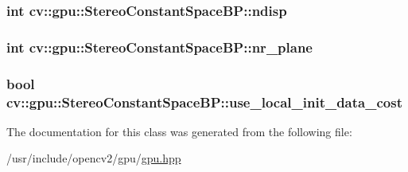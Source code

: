 \hypertarget{classcv_1_1gpu_1_1StereoConstantSpaceBP_ad581f8f942bce3c65131ef5db9051dd3}{
\subsubsection[{ndisp}]{\setlength{\rightskip}{0pt plus 5cm}int cv\-::gpu\-::\-Stereo\-Constant\-Space\-B\-P\-::ndisp}}\label{classcv_1_1gpu_1_1StereoConstantSpaceBP_ad581f8f942bce3c65131ef5db9051dd3}
\hypertarget{classcv_1_1gpu_1_1StereoConstantSpaceBP_a75c85050ba1c024997ff44dcd05593e4}{
\subsubsection[{nr\-\_\-plane}]{\setlength{\rightskip}{0pt plus 5cm}int cv\-::gpu\-::\-Stereo\-Constant\-Space\-B\-P\-::nr\-\_\-plane}}\label{classcv_1_1gpu_1_1StereoConstantSpaceBP_a75c85050ba1c024997ff44dcd05593e4}
\hypertarget{classcv_1_1gpu_1_1StereoConstantSpaceBP_adb71b7b7cdc36ff4ee1535dc0abd4d73}{
\subsubsection[{use\-\_\-local\-\_\-init\-\_\-data\-\_\-cost}]{\setlength{\rightskip}{0pt plus 5cm}bool cv\-::gpu\-::\-Stereo\-Constant\-Space\-B\-P\-::use\-\_\-local\-\_\-init\-\_\-data\-\_\-cost}}\label{classcv_1_1gpu_1_1StereoConstantSpaceBP_adb71b7b7cdc36ff4ee1535dc0abd4d73}


The documentation for this class was generated from the following file\-:\begin{DoxyCompactItemize}
\item 
/usr/include/opencv2/gpu/\hyperlink{gpu_2gpu_8hpp}{gpu.\-hpp}\end{DoxyCompactItemize}
